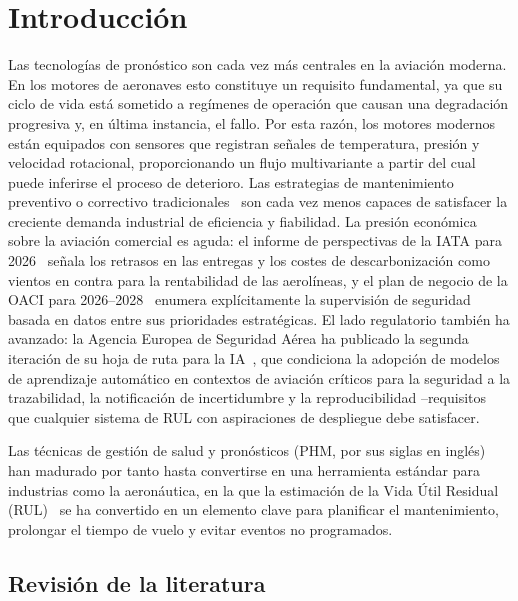 \documentclass[5p,times,authoryear]{elsarticle}
\begin{document}
\section{Introducción}\label{sec:intro}

Las tecnologías de pronóstico son cada vez más centrales en la aviación moderna. En los motores de aeronaves esto constituye un requisito fundamental, ya que su ciclo de vida está sometido a regímenes de operación que causan una degradación progresiva y, en última instancia, el fallo. Por esta razón, los motores modernos están equipados con sensores que registran señales de temperatura, presión y velocidad rotacional, proporcionando un flujo multivariante a partir del cual puede inferirse el proceso de deterioro. Las estrategias de mantenimiento preventivo o correctivo tradicionales~\citep{azadeh2015condition} son cada vez menos capaces de satisfacer la creciente demanda industrial de eficiencia y fiabilidad. La presión económica sobre la aviación comercial es aguda: el informe de perspectivas de la IATA para 2026~\citep{iata2026outlook} señala los retrasos en las entregas y los costes de descarbonización como vientos en contra para la rentabilidad de las aerolíneas, y el plan de negocio de la OACI para 2026--2028~\citep{icao2026plan} enumera explícitamente la supervisión de seguridad basada en datos entre sus prioridades estratégicas. El lado regulatorio también ha avanzado: la Agencia Europea de Seguridad Aérea ha publicado la segunda iteración de su hoja de ruta para la IA~\citep{easa2025roadmap}, que condiciona la adopción de modelos de aprendizaje automático en contextos de aviación críticos para la seguridad a la trazabilidad, la notificación de incertidumbre y la reproducibilidad --requisitos que cualquier sistema de RUL con aspiraciones de despliegue debe satisfacer.

Las técnicas de gestión de salud y pronósticos (PHM, por sus siglas en inglés)~\citep{tian2012artificial,xu2021machine} han madurado por tanto hasta convertirse en una herramienta estándar para industrias como la aeronáutica, en la que la estimación de la Vida Útil Residual (RUL)~\citep{si2011remaining} se ha convertido en un elemento clave para planificar el mantenimiento, prolongar el tiempo de vuelo y evitar eventos no programados.

\subsection{Revisión de la literatura}\label{sec:literature}
\end{document}
